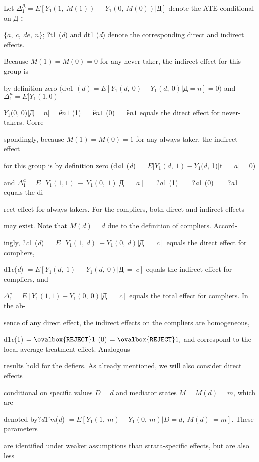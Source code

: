 \documentclass[a4paper,12pt]{article}
\begin{document}
Let $\Delta_{1}^{Д} = E[Y_{1}(1,\ M(1))\ -Y_{1}(0,\ M(0))|Д]$ denote the ATE conditional on $Д\in$

$\{a,\ c,\ de,\ n\}$; ?t1 ({\it d}) and dt1 ({\it d}) denote the corresponding direct and indirect effects.

Because $M(1) =M(0) =0$ for any never-taker, the indirect effect for this group is

by definition zero $($d{\it n}1 $(d)=E[Y_{1}(d,\ 0)-Y_{1}(d,\ 0)|Д=n]=0)$ and $\Delta_{1}^{n}=E[Y_{1}(1,0)-$

$Y_{1} (0$, 0$) |Д=n]=ё n1$ (1) $=ё n1$ (0) $=ё n1$ equals the direct effect for never-takers. Corre-

spondingly, because $M(1) = M(0) = 1$ for any always-taker, the indirect effect

for this group is by definition zero (d{\it a}1 ({\it d}) $= E[Y_{1}(d,\ 1) -Y_{1}(d$, 1)$|$t $= a] = 0$)

and $\Delta_{1}^{a} = E[Y_{1}(1,1)\ -\ Y_{1}(0,\ 1)|Д\ =\ a] =$ ?{\it a}1 (1) $=$ ?{\it a}1 (0) $=$ ?{\it a}1 equals the di-

rect effect for always-takers. For the compliers, both direct and indirect effects

may exist. Note that $M(d) = d$ due to the definition of compliers. Accord-

ingly, ?{\it c}1 ({\it d}) $= E[Y_{1}(1,\ d)\ -Y_{1}(0,\ d)|Д\ =\ c]$ equals the direct effect for compliers,

d1{\it c}({\it d}) $= E[Y_{1}(d,\ 1)\ -Y_{1}(d,\ 0)|Д\ =\ c]$ equals the indirect effect for compliers, and

$\Delta_{1}^{c} = E[Y_{1}(1,1)-Y_{1}(0,\ 0)|Д\ =\ c]$ equals the total effect for compliers. In the ab-

sence of any direct effect, the indirect effects on the compliers are homogeneous,

d1{\it c}(1) $=\ovalbox{\tt\small REJECT} 1$ (0) $=\ovalbox{\tt\small REJECT} 1,$ and correspond to the local average treatment effect. Analogous

results hold for the defiers. As already mentioned, we will also consider direct effects

conditional on specific values $D=d$ and mediator states $M=M(d)=m$, which are

denoted by?{\it d}1'{\it m}({\it d}) $=E[Y_{1}(1,\ m)-Y_{1}(0,\ m)|D=d,\ M(d)\ =m]$. These parameters

are identified under weaker assumptions than strata-specific effects, but are also less
\end{document}

